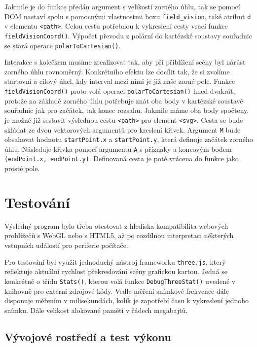 Jakmile je do funkce předán argument s velikostí zorného úhlu, tak se pomocí DOM nastaví spolu s  pomocnými vlastnostmi boxu \texttt{field\_vision}, také atribut \texttt{d} v elementu \texttt{<path>}. Celou cestu potřebnou k vykreslení cesty vrací funkce \texttt{fieldVisionCoord()}. Výpočet převodu z polární  do kartézské soustavy souřadnic  se stará operace \texttt{polarToCartesian()}.

Interakce s kolečkem musíme zrealizovat tak, aby při přiblížení scény byl nárůst zorného úhlu rovnoměrný. Konkrétního efektu lze docílit tak, že si zvolíme startovní a cílový úhel, kdy interval mezi nimi je již naše zorné pole. Funkce \texttt{fieldVisionCoord()} proto volá operaci \texttt{polarToCartesian()} hned dvakrát, protože na základě zorného úhlu potřebuje znát oba body v kartézské soustavě souřadnic jak pro začátek, tak konec rozsahu. Jakmile máme oba body spočteny, je možné již sestavit výslednou cestu \texttt{<path>} pro element \texttt{<svg>}. Cesta se bude skládat ze dvou vektorových argumentů pro kreslení křivek. Argument \texttt{M} bude obsahovat hodnotu \texttt{startPoint.x} a \texttt{startPoint.y}, která definuje začátek zorného úhlu. Následuje křivka pomocí argumentu \texttt{A} s příznaky a  koncovým bodem \texttt{(endPoint.x, endPoint.y)}. Definovaná cesta je poté vrácena do funkce \texttt{\createFieldVision} jako prosté pole.




\chapter{Testování}
\label{chapter:5}
Výsledný program bylo třeba otestovat z  hlediska kompatibilita webových prohlížečů  s WebGL nebo s HTML5, až po rozdílnou interpretaci některých vstupních událostí pro periferie počítače. 

Pro testování byl využit jednoduchý nástroj frameworku \texttt{three.js}, který reflektuje aktuální rychlost překreslování scény grafickou kartou. Jedná se konkrétně o třídu \texttt{Stats()}, kterou volá funkce \texttt{DebugThreeStat()} uvedené v knihovně pro externí zdrojové kódy. Vedle měření snímkové frekvence dále disponuje měřením v milisekundách, kolik je zapotřebí času k vykreslení jednoho snímku. Dále velikost alokované paměti v řádech megabajtů.

\section*{Vývojové rostředí a test výkonu}


